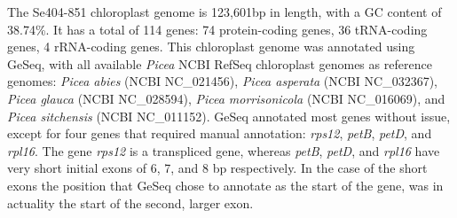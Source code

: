 \documentclass[titlepage,11pt, oneside]{article}   	%
\begin{document}
The Se404-851 chloroplast genome is 123,601bp in length, with a GC content of 38.74\%. It has a total of 114 genes: 74 protein-coding genes, 36 tRNA-coding genes, 4 rRNA-coding genes. This chloroplast genome was annotated using GeSeq, with all available \textit{Picea} NCBI RefSeq chloroplast genomes as reference genomes: \textit{Picea abies} (NCBI NC\_021456), \textit{Picea asperata} (NCBI NC\_032367), \textit{Picea glauca} (NCBI NC\_028594), \textit{Picea morrisonicola} (NCBI NC\_016069), and \textit{Picea sitchensis} (NCBI NC\_011152). GeSeq annotated most genes without issue, except for four genes that required manual annotation: \textit{rps12}, \textit{petB}, \textit{petD}, and \textit{rpl16}. The gene \textit{rps12} is a transpliced gene, whereas \textit{petB}, \textit{petD}, and \textit{rpl16} have very short initial exons of 6, 7, and 8 bp respectively. In the case of the short exons the position that GeSeq chose to annotate as the start of the gene, was in actuality the start of the second, larger exon. 
\end{document}
